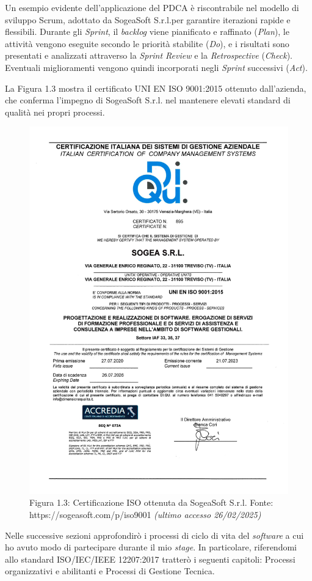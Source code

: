     \noindent Un esempio evidente dell’applicazione del PDCA è riscontrabile nel modello di sviluppo Scrum, adottato da SogeaSoft S.r.l.per garantire iterazioni rapide e flessibili. Durante gli \textit{Sprint}, il \textit{backlog} viene pianificato e raffinato (\textit{Plan}), le attività vengono eseguite secondo le priorità stabilite (\textit{Do}), e i risultati sono presentati e analizzati attraverso la \textit{Sprint Review} e la \textit{Retrospective} (\textit{Check}). Eventuali miglioramenti vengono quindi incorporati negli \textit{Sprint} successivi (\textit{Act}).
    
    \noindent La Figura 1.3 mostra il certificato UNI EN ISO 9001:2015 ottenuto dall’azienda, che conferma l’impegno di SogeaSoft S.r.l. nel mantenere elevati standard di qualità nei propri processi.

    \begin{figure}[H]
        \centering
        \includegraphics[width=0.5\linewidth]{BCS-Tessi/images/CertificatoSogea.jpg}
        \caption{Figura 1.3: Certificazione ISO ottenuta da SogeaSoft S.r.l.
        Fonte: https://sogeasoft.com/p/iso9001 \textit{(ultimo accesso 26/02/2025)}}
        \label{fig:certificazione-iso}
    \end{figure}

    \noindent Nelle successive sezioni approfondirò i processi di ciclo di vita del \textit{software} a cui ho avuto modo di partecipare durante il mio \textit{stage}. In particolare, riferendomi allo standard ISO/IEC/IEEE 12207:2017 tratterò i seguenti capitoli: Processi organizzativi e abilitanti e Processi di Gestione Tecnica.
    
    
